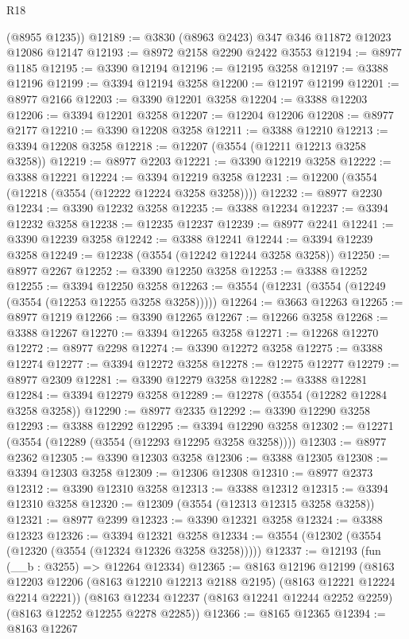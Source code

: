 \begin{lexlean}{R18}
\begin{coremodule}
      (@8955 @1235))
@12189 := @3830 (@8963 @2423) @347 @346 @11872 @12023 @12086 @12147
@12193 := @8972 @2158 @2290 @2422 @3553
@12194 := @8977 @1185
@12195 := @3390 @12194
@12196 := @12195 @3258
@12197 := @3388 @12196
@12199 := @3394 @12194 @3258
@12200 := @12197 @12199
@12201 := @8977 @2166
@12203 := @3390 @12201 @3258
@12204 := @3388 @12203
@12206 := @3394 @12201 @3258
@12207 := @12204 @12206
@12208 := @8977 @2177
@12210 := @3390 @12208 @3258
@12211 := @3388 @12210
@12213 := @3394 @12208 @3258
@12218 := @12207 (@3554 (@12211 @12213 @3258 @3258))
@12219 := @8977 @2203
@12221 := @3390 @12219 @3258
@12222 := @3388 @12221
@12224 := @3394 @12219 @3258
@12231 := @12200 (@3554 (@12218 (@3554 (@12222 @12224 @3258 @3258))))
@12232 := @8977 @2230
@12234 := @3390 @12232 @3258
@12235 := @3388 @12234
@12237 := @3394 @12232 @3258
@12238 := @12235 @12237
@12239 := @8977 @2241
@12241 := @3390 @12239 @3258
@12242 := @3388 @12241
@12244 := @3394 @12239 @3258
@12249 := @12238 (@3554 (@12242 @12244 @3258 @3258))
@12250 := @8977 @2267
@12252 := @3390 @12250 @3258
@12253 := @3388 @12252
@12255 := @3394 @12250 @3258
@12263 := @3554 (@12231 (@3554 (@12249 (@3554 (@12253 @12255 @3258 @3258)))))
@12264 := @3663 @12263
@12265 := @8977 @1219
@12266 := @3390 @12265
@12267 := @12266 @3258
@12268 := @3388 @12267
@12270 := @3394 @12265 @3258
@12271 := @12268 @12270
@12272 := @8977 @2298
@12274 := @3390 @12272 @3258
@12275 := @3388 @12274
@12277 := @3394 @12272 @3258
@12278 := @12275 @12277
@12279 := @8977 @2309
@12281 := @3390 @12279 @3258
@12282 := @3388 @12281
@12284 := @3394 @12279 @3258
@12289 := @12278 (@3554 (@12282 @12284 @3258 @3258))
@12290 := @8977 @2335
@12292 := @3390 @12290 @3258
@12293 := @3388 @12292
@12295 := @3394 @12290 @3258
@12302 := @12271 (@3554 (@12289 (@3554 (@12293 @12295 @3258 @3258))))
@12303 := @8977 @2362
@12305 := @3390 @12303 @3258
@12306 := @3388 @12305
@12308 := @3394 @12303 @3258
@12309 := @12306 @12308
@12310 := @8977 @2373
@12312 := @3390 @12310 @3258
@12313 := @3388 @12312
@12315 := @3394 @12310 @3258
@12320 := @12309 (@3554 (@12313 @12315 @3258 @3258))
@12321 := @8977 @2399
@12323 := @3390 @12321 @3258
@12324 := @3388 @12323
@12326 := @3394 @12321 @3258
@12334 := @3554 (@12302 (@3554 (@12320 (@3554 (@12324 @12326 @3258 @3258)))))
@12337 := @12193 (fun (__b : @3255) => @12264 @12334)
@12365 := @8163
    @12196
    @12199
    (@8163 @12203 @12206 (@8163 @12210 @12213 @2188 @2195) (@8163 @12221 @12224 @2214 @2221))
    (@8163 @12234 @12237 (@8163 @12241 @12244 @2252 @2259) (@8163 @12252 @12255 @2278 @2285))
@12366 := @8165 @12365
@12394 := @8163
    @12267

\end{coremodule}
\end{lexlean}
